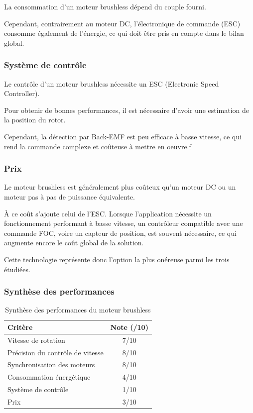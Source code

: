 La consommation d'un moteur brushless dépend du couple fourni.

Cependant, contrairement au moteur DC, l'électronique de commande (ESC) consomme également de l'énergie, ce qui doit être pris en compte dans le bilan global.

\subsubsection{Système de contrôle}

Le contrôle d'un moteur brushless nécessite un ESC (Electronic Speed Controller).

Pour obtenir de bonnes performances, il est nécessaire d'avoir une estimation de la position du rotor.

Cependant, la détection par Back-EMF est peu efficace à basse vitesse, ce qui rend la commande complexe et coûteuse à mettre en oeuvre.f

\subsubsection{Prix}

Le moteur brushless est généralement plus coûteux qu'un moteur DC ou un moteur pas à pas de puissance équivalente.

À ce coût s'ajoute celui de l'ESC. Lorsque l'application nécessite un fonctionnement performant à basse vitesse, un contrôleur compatible avec une commande FOC, voire un capteur de position, est souvent nécessaire, ce qui augmente encore le coût global de la solution.

Cette technologie représente donc l'option la plus onéreuse parmi les trois étudiées.

\subsubsection{Synthèse des performances}

\begin{table}[H]
    \centering
    \begin{tabular}{|l|c|}
        \hline
        \textbf{Critère} & \textbf{Note (/10)} \\
        \hline
        Vitesse de rotation & 7/10 \\
        \hline
        Précision du contrôle de vitesse & 8/10 \\
        \hline
        Synchronisation des moteurs & 8/10 \\
        \hline
        Consommation énergétique & 4/10 \\
        \hline
        Système de contrôle & 1/10 \\
        \hline
        Prix & 3/10 \\
        \hline
    \end{tabular}
    \caption{Synthèse des performances du moteur brushless}
    \label{tab:brushless_resultats}
\end{table}

